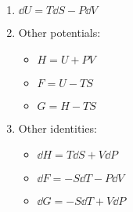 

\vspace*{\fill}
\centering

\begin{enumerate}
    \item $\displaystyle \dd{U} = T\dd{S} - P\dd{V}$
    \item Other potentials:
        \begin{itemize}
            \item $H = U + PV$ 
            \item $F = U - TS$
            \item $G = H - TS$
        \end{itemize}
    \item Other identities:
        \begin{itemize}
            \item $\dd{H} = T\dd{S} + V\dd{P}$ 
            \item $\dd{F} = -S\dd{T} - P\dd{V}$
            \item $\dd{G} = -S \dd{T} + V\dd{P}$
        \end{itemize}
\end{enumerate}

\centering
\vspace*{\fill}

